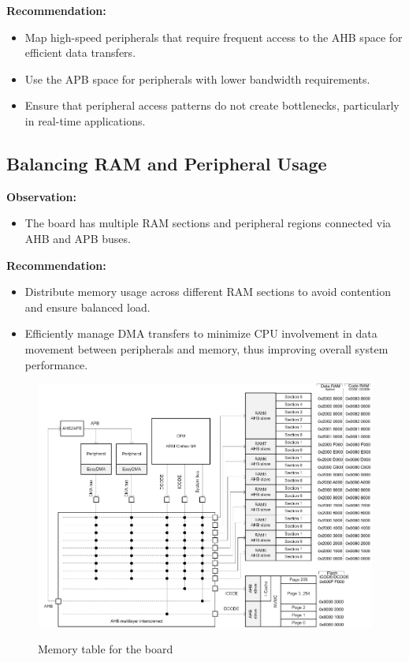 \documentclass{Configuration_Files/PoliMi3i_thesis}
\begin{document}
\textbf{Recommendation:}
\begin{itemize}
    \item Map high-speed peripherals that require frequent access to the AHB space for efficient data transfers.
    \item Use the APB space for peripherals with lower bandwidth requirements.
    \item Ensure that peripheral access patterns do not create bottlenecks, particularly in real-time applications.
\end{itemize}

\subsection{Balancing RAM and Peripheral Usage}
\textbf{Observation:}
\begin{itemize}
    \item The board has multiple RAM sections and peripheral regions connected via AHB and APB buses.
\end{itemize}

\textbf{Recommendation:}
\begin{itemize}
    \item Distribute memory usage across different RAM sections to avoid contention and ensure balanced load.
    \item Efficiently manage DMA transfers to minimize CPU involvement in data movement between peripherals and memory, thus improving overall system performance.
\end{itemize}

\begin{figure}[H]
    \includegraphics[scale=0.3]{memNRF.png}
    \centering
    \label{mem_table_1}
    \caption{Memory table for the board \cite{NordicSemiconductorInfocenter}}
    \end{figure}
\end{document}
